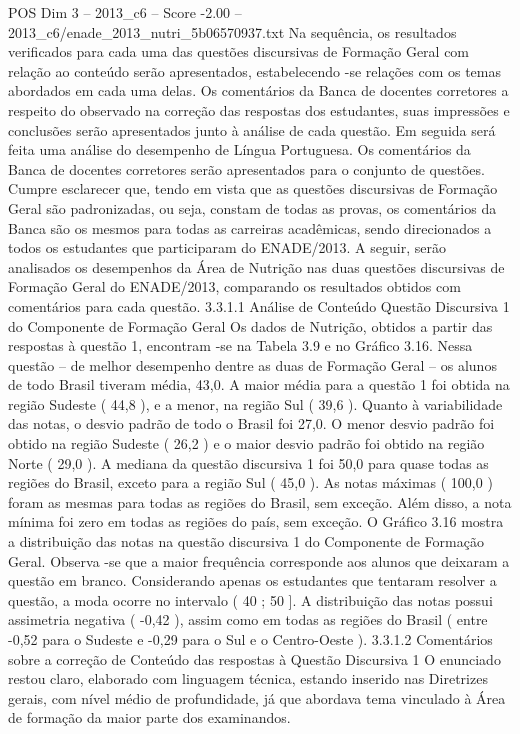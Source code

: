 \begin{textsample}{POS Dim 3 – 2013\_c6 – Score -2.00 – 2013\_c6/enade\_2013\_nutri\_5b06570937.txt}
Na sequência, os resultados verificados para cada uma das questões discursivas de Formação Geral com relação ao conteúdo serão apresentados, estabelecendo -se relações com os temas abordados em cada uma delas.
Os comentários da Banca de docentes corretores a respeito do observado na correção das respostas dos estudantes, suas impressões e conclusões serão apresentados junto à análise de cada questão.
Em seguida será feita uma análise do desempenho de Língua Portuguesa.
Os comentários da Banca de docentes corretores serão apresentados para o conjunto de questões.
Cumpre esclarecer que, tendo em vista que as questões discursivas de Formação Geral são padronizadas, ou seja, constam de todas as provas, os comentários da Banca são os mesmos para todas as carreiras acadêmicas, sendo direcionados a todos os estudantes que participaram do ENADE/2013.
A seguir, serão analisados os desempenhos da Área de Nutrição nas duas questões discursivas de Formação Geral do ENADE/2013, comparando os resultados obtidos com comentários para cada questão. 3.3.1.1 Análise de Conteúdo Questão Discursiva 1 do Componente de Formação Geral Os dados de Nutrição, obtidos a partir das respostas à questão 1, encontram -se na Tabela 3.9 e no Gráfico 3.16.
Nessa questão – de melhor desempenho dentre as duas de Formação Geral – os alunos de todo Brasil tiveram média, 43,0.
A maior média para a questão 1 foi obtida na região Sudeste ( 44,8 ), e a menor, na região Sul ( 39,6 ).
Quanto à variabilidade das notas, o desvio padrão de todo o Brasil foi 27,0.
O menor desvio padrão foi obtido na região Sudeste ( 26,2 ) e o maior desvio padrão foi obtido na região Norte ( 29,0 ).
A mediana da questão discursiva 1 foi 50,0 para quase todas as regiões do Brasil, exceto para a região Sul ( 45,0 ).
As notas máximas ( 100,0 ) foram as mesmas para todas as regiões do Brasil, sem exceção.
Além disso, a nota mínima foi zero em todas as regiões do país, sem exceção.
O Gráfico 3.16 mostra a distribuição das notas na questão discursiva 1 do Componente de Formação Geral.
Observa -se que a maior frequência corresponde aos alunos que deixaram a questão em branco.
Considerando apenas os estudantes que tentaram resolver a questão, a moda ocorre no intervalo ( 40 ; 50 ].
A distribuição das notas possui assimetria negativa ( -0,42 ), assim como em todas as regiões do Brasil ( entre -0,52 para o Sudeste e -0,29 para o Sul e o Centro-Oeste ). 3.3.1.2 Comentários sobre a correção de Conteúdo das respostas à Questão Discursiva 1 O enunciado restou claro, elaborado com linguagem técnica, estando inserido nas Diretrizes gerais, com nível médio de profundidade, já que abordava tema vinculado à Área de formação da maior parte dos examinandos.

\end{textsample}
